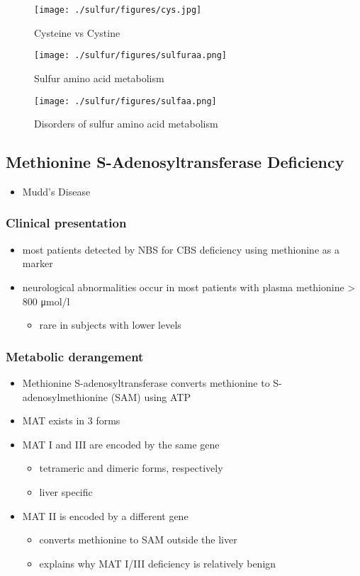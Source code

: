\documentclass{scrartcl}
\begin{document}
\begin{figure}[htbp]
\centering
\texttt{[image: ./sulfur/figures/cys.jpg]}
\caption{\label{fig:org78a467a}
Cysteine vs Cystine}
\end{figure}

\begin{figure}[htbp]
\centering
\texttt{[image: ./sulfur/figures/sulfuraa.png]}
\caption{\label{fig:org8b01682}
Sulfur amino acid metabolism}
\end{figure}

\begin{figure}[htbp]
\centering
\texttt{[image: ./sulfur/figures/sulfaa.png]}
\caption{\label{fig:orge68120b}
Disorders of sulfur amino acid metabolism}
\end{figure}

\subsection{Methionine S-Adenosyltransferase Deficiency}
\label{sec:org6c447d6}
\begin{itemize}
\item Mudd’s Disease
\end{itemize}
\subsubsection{Clinical presentation}
\label{sec:org1dc9025}
\begin{itemize}
\item most patients detected by NBS for CBS deficiency using methionine as a marker
\item neurological abnormalities occur in most patients with plasma methionine \textgreater{} 800 μmol/l
\begin{itemize}
\item rare in subjects with lower levels
\end{itemize}
\end{itemize}
\subsubsection{Metabolic derangement}
\label{sec:orgca579a7}
\begin{itemize}
\item Methionine S-adenosyltransferase converts methionine to S-adenosylmethionine (SAM) using ATP
\item MAT exists in 3 forms
\item MAT I and III are encoded by the same gene
\begin{itemize}
\item tetrameric and dimeric forms, respectively
\item liver specific
\end{itemize}
\item MAT II is encoded by a different gene
\begin{itemize}
\item converts methionine to SAM outside the liver
\item explains why MAT I/III deficiency is relatively benign
\end{itemize}
\end{itemize}
\end{document}
